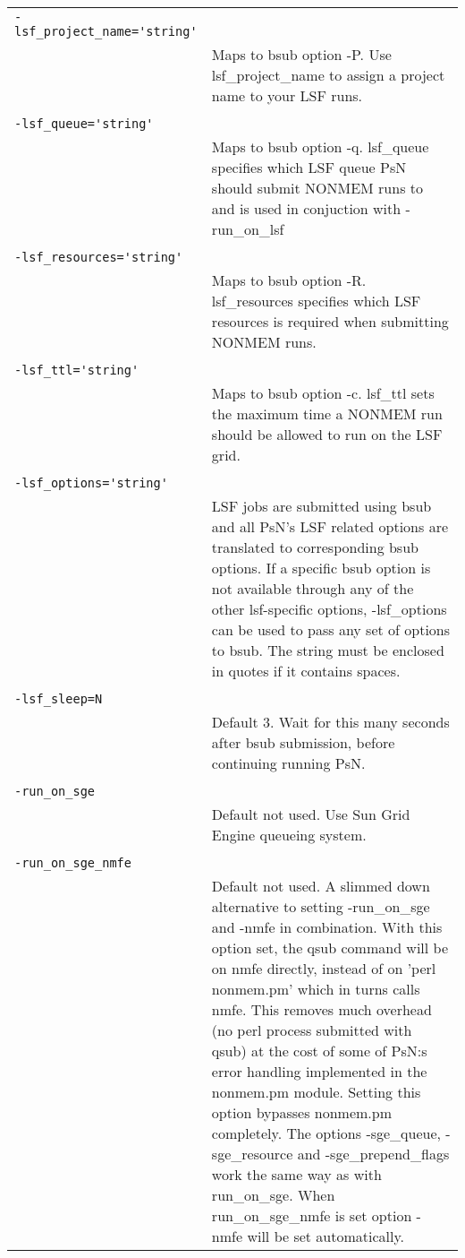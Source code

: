 \documentclass[a4paper,12pt]{article}
\begin{document}
\begin{longtable}{p{1in}p{4in}}
\\
\verb|-lsf_project_name='string'| & \\
\nopagebreak
 & Maps to bsub option -P. Use lsf\_project\_name to assign a project name to your LSF runs. \\
\\
\verb|-lsf_queue='string'| & \\
\nopagebreak
 & Maps to bsub option -q. lsf\_queue specifies which LSF queue PsN should submit NONMEM runs to and is used in conjuction with -run\_on\_lsf \\
\\
\verb|-lsf_resources='string'| & \\
\nopagebreak
 & Maps to bsub option -R. lsf\_resources specifies which LSF resources is required when submitting NONMEM runs. \\
\\
\verb|-lsf_ttl='string'| & \\
\nopagebreak
 & Maps to bsub option -c. lsf\_ttl sets the maximum time a NONMEM run should be allowed to run on the LSF grid. \\
\\
\verb|-lsf_options='string'| & \\
\nopagebreak
 & LSF jobs are submitted using bsub and all PsN's LSF related options are translated to corresponding bsub options. If a specific bsub option is not available through any of the other lsf-specific options, -lsf\_options can be used to pass any set of options to bsub. The string must be enclosed in quotes if it contains spaces. \\
\\
\verb|-lsf_sleep=N| & \\
\nopagebreak
 & Default 3. Wait for this many seconds after bsub submission, before continuing running PsN. \\
\\
\verb|-run_on_sge| & \\
\nopagebreak
 & Default not used. Use Sun Grid Engine queueing system. \\
\\
\verb|-run_on_sge_nmfe| & \\
\nopagebreak
 & Default not used. A slimmed down alternative to setting -run\_on\_sge and -nmfe in combination. With this option set, the qsub command will be on nmfe directly, instead of on 'perl nonmem.pm' which in turns calls nmfe. This removes much overhead (no perl process submitted with qsub) at the cost of some of PsN:s error handling implemented in the nonmem.pm module. Setting this option bypasses nonmem.pm completely. The options -sge\_queue, -sge\_resource and -sge\_prepend\_flags work the same way as with run\_on\_sge. When run\_on\_sge\_nmfe is set option -nmfe will be set automatically.  \\

\end{longtable}
\end{document}
